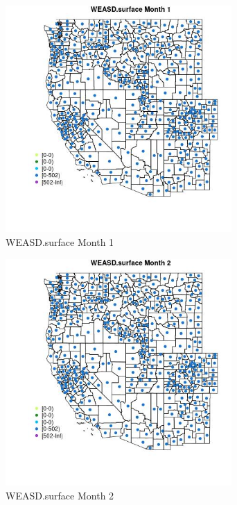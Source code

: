 \begin{figure} 
\centering  
\includegraphics[width=0.77\textwidth]{Code_Outputs/df_report_ML_predictors_CountyCentroid_Locations_Dates_2008-01-01to2018-12-31_MapObsMo1WEASDsurface.jpg} 
\caption{\label{fig:df_report_ML_predictors_CountyCentroid_Locations_Dates_2008-01-01to2018-12-31MapObsMo1WEASDsurface}WEASD.surface Month 1} 
\end{figure} 
 

\begin{figure} 
\centering  
\includegraphics[width=0.77\textwidth]{Code_Outputs/df_report_ML_predictors_CountyCentroid_Locations_Dates_2008-01-01to2018-12-31_MapObsMo2WEASDsurface.jpg} 
\caption{\label{fig:df_report_ML_predictors_CountyCentroid_Locations_Dates_2008-01-01to2018-12-31MapObsMo2WEASDsurface}WEASD.surface Month 2} 
\end{figure} 
 

